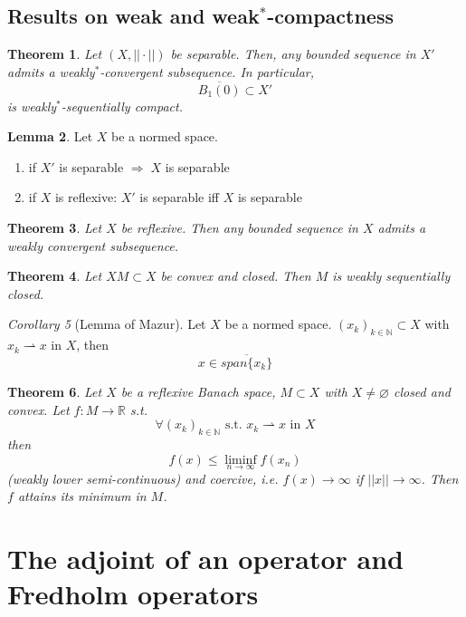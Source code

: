 \documentclass[a4paper, 12pt]{article}
\theoremstyle{plain}
\newtheorem{theorem}{Theorem}[subsection] %
\theoremstyle{definition}
\theoremstyle{lemma}
\newtheorem{lemma}[theorem]{Lemma}
\theoremstyle{remark}
\theoremstyle{corollary}
\newtheorem{corollary}[theorem]{Corollary}
\theoremstyle{example}
\begin{document}
	\subsection{Results on weak and weak$^*$-compactness}
	\begin{theorem}
		Let $(X,||\cdot||)$ be separable. Then, any bounded sequence in $X'$ admits a weakly$^*$-convergent subsequence. In particular, \[\overline{B_1(0)} \subset X'\] is weakly$^*$-sequentially compact.
	\end{theorem}
	\begin{lemma}
		Let $X$ be a normed space. \begin{enumerate}
			\item if $X'$ is separable $\Rightarrow \; X$ is separable
			\item if $X$ is reflexive: $X'$ is separable iff $X$ is separable
		\end{enumerate} 
	\end{lemma}
	\begin{theorem}
		Let $X$ be reflexive. Then any bounded sequence in $X$ admits a weakly convergent subsequence.
	\end{theorem}
	\begin{theorem}
		Let $XM\subset X$ be convex and closed. Then $M$ is weakly sequentially closed.
	\end{theorem}
	\begin{corollary}[Lemma of Mazur]
		Let $X$ be a normed space. $(x_k)_{k\in \mathbb{N}} \subset X$ with $x_k \rightharpoonup x$ in $X$, then \[x\in \overline{span\{x_k\}}\]
	\end{corollary}
	\begin{theorem}
		Let $X$ be a reflexive Banach space, $M\subset X$ with $X\neq \varnothing$ closed and convex. Let $f:M\to\mathbb{R}$ s.t. \[\forall (x_k)_{k\in\mathbb{N}} \text{ s.t. } x_k \rightharpoonup x \text{ in } X\] then \[f(x)\leq \liminf_{n\to \infty} f(x_n)\] (weakly lower semi-continuous) and coercive, i.e. $f(x)\to \infty$ if $||x||\to \infty$. Then $f$ attains its minimum in $M$.
	\end{theorem}
	\section{The adjoint of an operator and Fredholm operators}
\end{document}
